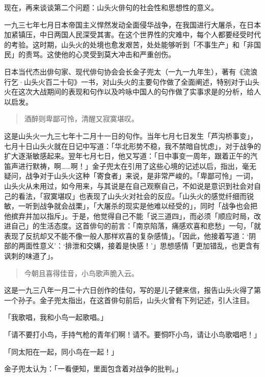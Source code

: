 {现在，再来谈谈第二个问题：山头火俳句的社会性和思想性的意义。

一九三七年七月日本帝国主义悍然发动全面侵华战争，在我国进行大屠杀，在日本加紧镇压，中日两国人民深受其害。在这个世界性的灾难中，每个人都要经受时代的考验。这时期，山头火的处境也愈发艰苦，处处能够听到「不事生产」和「非国民」的责骂。这使他的心灵受到莫大冲击和严重创伤。

日本当代杰出俳句家、现代俳句协会会长金子兜太（一九一九年生），著有《流浪行乞·山头火百二十句》一书，对山头火的主要句作做了全面阐述，特别对于山头火在这次大战期间的表现和句作以及吟咏中国人的句作做了实事求是的分析，给人以启发。
\begin{quote}
    酒醉则卑鄙可怜，清醒又寂寞堪叹。
\end{quote}

这是山头火一九三七年十二月十一日的句作。当年七月七日发生「芦沟桥事变」，七月十日山头火就在日记中写道：「华北形势不稳，我不禁暗自忧虑」，对于战争的扩大逐渐敏感起来。翌年七月七日，他又写道：「日中事变一周年，跟着正午的汽笛声进行默祷\footnotemark[10]，啊……啊！」金子兜太在引用了这些心境的记述以后，指出，毫无疑问，战争对于山头火这种「寄食者」来说，是非常严峻的。「卑鄙可怜」一词，山头火从未用过，如今用来，与其说是在自己观察自己，不如说是意识到社会对自己的看法，「寂寞堪叹」也表现了山头火对社会的反应。「山头火的感觉纤细而锐敏，一听到战争就会战栗」，「大屠杀的现实是他难以经受的」，同时「战争也会把他摈弃并加以指斥」。于是，他觉得自己不能「说三道四」，而必须「顺应时局，改进自己」的生活态度。这首俳句的前言：「南京陷落，痛感欢喜和悲愁」一句，「就表现了反抗却又不能不像一般人那样欢喜的复杂感情」。「因此，他接着写道：‘阴部的两面性意义’：‘排泄和交媾，接着是快感！’」思想感情「更加错乱，也更含有讽刺的味道了」。


\begin{quote}
    今朝且喜得佳音，小鸟歌声脆入云。
\end{quote}

这是一九三八年一月二十六日创作的佳句，写的是儿子健来信，报告山头火得了第一个孙子。金子兜太指出，在这首俳句前后，山头火曾有下列记述，引人注目。

「我歌唱，我和小鸟一起歌唱。」

「请不要打小鸟，手持气枪的青年们啊！请不。要恫吓小鸟，请让小鸟歌唱吧！」

「同太阳在一起，同小鸟在一起！」

金子兜太认为：「一看便知，里面包含着对战争的批判。」

}
